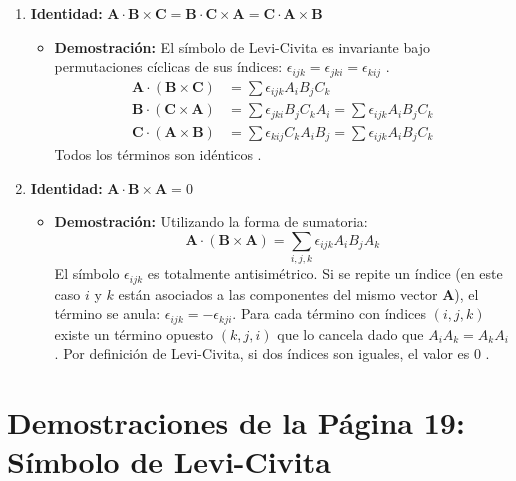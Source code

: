 \documentclass[a4paper]{article}
\begin{document}
\begin{enumerate}
    \item \textbf{Identidad:} $\mathbf{A} \cdot \mathbf{B} \times \mathbf{C} = \mathbf{B} \cdot \mathbf{C} \times \mathbf{A} = \mathbf{C} \cdot \mathbf{A} \times \mathbf{B}$
    \begin{itemize}
        \item \textbf{Demostración:} El símbolo de Levi-Civita es invariante bajo permutaciones cíclicas de sus índices: $\epsilon_{ijk} = \epsilon_{jki} = \epsilon_{kij}$ \cite{71}.
        \begin{align*}
            \mathbf{A} \cdot (\mathbf{B} \times \mathbf{C}) &= \sum \epsilon_{ijk} A_i B_j C_k \\
            \mathbf{B} \cdot (\mathbf{C} \times \mathbf{A}) &= \sum \epsilon_{jki} B_j C_k A_i = \sum \epsilon_{ijk} A_i B_j C_k \\
            \mathbf{C} \cdot (\mathbf{A} \times \mathbf{B}) &= \sum \epsilon_{kij} C_k A_i B_j = \sum \epsilon_{ijk} A_i B_j C_k
        \end{align*}
        Todos los términos son idénticos \cite{73}.
    \end{itemize}

    \item \textbf{Identidad:} $\mathbf{A} \cdot \mathbf{B} \times \mathbf{A} = 0$
    \begin{itemize}
        \item \textbf{Demostración:} Utilizando la forma de sumatoria:
        \begin{equation*}
            \mathbf{A} \cdot (\mathbf{B} \times \mathbf{A}) = \sum_{i,j,k} \epsilon_{ijk} A_i B_j A_k
        \end{equation*}
        El símbolo $\epsilon_{ijk}$ es totalmente antisimétrico. Si se repite un índice (en este caso $i$ y $k$ están asociados a las componentes del mismo vector $\mathbf{A}$), el término se anula: $\epsilon_{ijk} = -\epsilon_{kji}$. Para cada término con índices $(i,j,k)$ existe un término opuesto $(k,j,i)$ que lo cancela dado que $A_i A_k = A_k A_i$. Por definición de Levi-Civita, si dos índices son iguales, el valor es 0 \cite{71, 73}.
    \end{itemize}
\end{enumerate}


\section*{Demostraciones de la Página 19: Símbolo de Levi-Civita}
\end{document}
